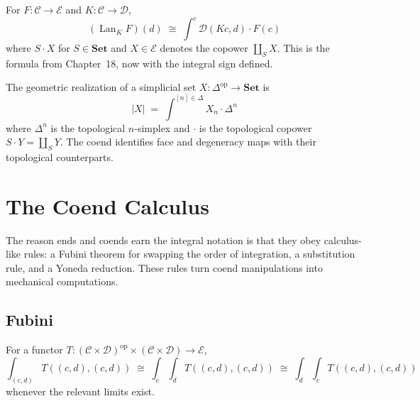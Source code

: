 \begin{example_thm}
\label{ex:lan-coend}
For $F : \mathcal{C} \to \mathcal{E}$ and $K : \mathcal{C} \to \mathcal{D}$,
\begin{equation*}
  (\operatorname{Lan}_K F)(d) \;\cong\; \int^c \mathcal{D}(Kc, d) \cdot F(c)
\end{equation*}
where $S \cdot X$ for $S \in \mathbf{Set}$ and $X \in \mathcal{E}$ denotes
the copower $\coprod_{S} X$. This is the formula from Chapter~18, now with
the integral sign defined.
\end{example_thm}

\begin{example_thm}
The geometric realization of a simplicial set $X : \Delta^{\mathrm{op}} \to
\mathbf{Set}$ is
\begin{equation*}
  |X| \;=\; \int^{[n] \in \Delta} X_n \cdot \Delta^n
\end{equation*}
where $\Delta^n$ is the topological $n$-simplex and $\cdot$ is the topological
copower $S \cdot Y = \coprod_S Y$. The coend identifies face and degeneracy
maps with their topological counterparts.
\end{example_thm}


\section{The Coend Calculus}
\label{sec:coend-calculus}

The reason ends and coends earn the integral notation is that they obey
calculus-like rules: a Fubini theorem for swapping the order of integration,
a substitution rule, and a Yoneda reduction. These rules turn coend
manipulations into mechanical computations.

\subsection{Fubini}

\begin{theorem}
\label{thm:fubini-end}
For a functor $T : (\mathcal{C} \times \mathcal{D})^{\mathrm{op}} \times
(\mathcal{C} \times \mathcal{D}) \to \mathcal{E}$,
\begin{equation*}
  \int_{(c, d)} T((c, d), (c, d))
  \;\cong\;
  \int_c \int_d T((c, d), (c, d))
  \;\cong\;
  \int_d \int_c T((c, d), (c, d))
\end{equation*}
whenever the relevant limits exist.
\end{theorem}

